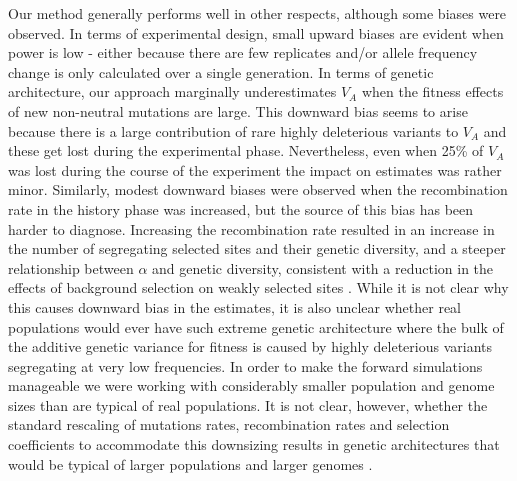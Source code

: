 \documentclass[12pt]{article}
\begin{document}
\begin{bibunit}
Our method generally performs well in other respects, although some biases were observed. In terms of experimental design, small upward biases are evident when power is low - either because there are few replicates and/or allele frequency change is only calculated over a single generation. In terms of genetic architecture, our approach marginally underestimates $V_A$ when the fitness effects of new non-neutral mutations are large. This downward bias seems to arise because there is a large contribution of rare highly deleterious variants to $V_A$ and these get lost during the experimental phase. Nevertheless, even when 25\% of $V_A$ was lost during the course of the experiment the impact on estimates was rather minor.  Similarly, modest downward biases were observed when the recombination rate in the history phase was increased, but the source of this bias has been harder to diagnose. Increasing the recombination rate resulted in an increase in the number of segregating selected sites and their genetic diversity, and a steeper relationship between $\alpha$ and genetic diversity, consistent with a reduction in the effects of background selection \citep{charlesworth1993effect} on weakly selected sites \citep{stephan1999effect}.  While it is not clear why this causes downward bias in the estimates, it is also unclear whether real populations would ever have such extreme genetic architecture where the bulk of the additive genetic variance for fitness is caused by highly deleterious variants segregating at very low frequencies. In order to make the forward simulations manageable we were working with considerably smaller population and genome sizes than are typical of real populations. It is not clear, however, whether the standard rescaling of mutations rates, recombination rates and selection coefficients to accommodate this downsizing results in genetic architectures that would be typical of larger populations and larger genomes \citep{dabi2025population}. 


\end{bibunit}
\end{document}
